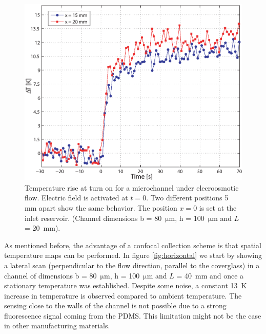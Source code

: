 \documentclass[twocolumn]{svjour3}       %
\begin{document}
\begin{figure}[h!]
\centering
\includegraphics[width=\columnwidth]{figs/fig4.eps}
\caption{Temperature rise at turn on for a microchannel under elecroosmotic flow. Electric field is activated at $t=0$. Two different positions 5 mm apart show the same behavior. The position $x=0$ is set at the inlet reservoir. (Channel dimensions  b = 80~$\mathrm{\mu m}$, h = 100~$\mathrm{\mu m}$ and $L$ = 20~mm).\label{fig:temporal}}
\end{figure}

As mentioned before, the advantage of a confocal collection scheme is that spatial temperature maps can be performed. In figure \ref{fig:horizontal} we start by showing a lateral scan (perpendicular to the flow direction, parallel to the coverglass) in a channel of dimensions b = 80~$\mathrm{\mu m}$, h = 100~$\mathrm{\mu m}$ and $L$ = 40~mm and once a stationary temperature was established. Despite some noise, a constant 13~K increase in temperature is observed compared to ambient temperature. The sensing close to the walls of the channel is not possible due to a strong fluorescence signal coming from the PDMS. This limitation might not be the case in other manufacturing materials.
\end{document}
